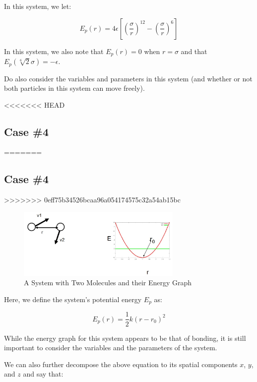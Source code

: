 \documentclass[
  letterpaper,
  DIV=11,
  numbers=noendperiod]{scrreprt}
\begin{document}
In this system, we let:

\begin{equation}
  E_p(r) = 4\epsilon\left[\left(\frac{\sigma}{r}\right)^{12} - \left(\frac{\sigma}{r}\right)^6\right]
\end{equation}

In this system, we also note that \(E_p(r) = 0\) when \(r = \sigma\) and
that \(\displaystyle E_p(\sqrt[6]{2}\sigma) = -\epsilon\).

Do also consider the variables and parameters in this system (and
whether or not both particles in this system can move freely).

<<<<<<< HEAD
\hypertarget{case-4-1}{%
\subsection{Case \#4}\label{case-4-1}}
=======
\hypertarget{case-4}{%
\subsection{Case \#4}\label{case-4}}
>>>>>>> 0eff75b34526bcaa96a054174575c32a54ab15bc

\begin{figure}

{\centering \includegraphics[width=3.13in,height=\textheight]{./images/wk1/sys4.jpg}

}

\caption{A System with Two Molecules and their Energy Graph}

\end{figure}

Here, we define the system's potential energy \(E_p\) as:

\begin{equation}
  E_p(r) = \frac{1}{2}k(r - r_0)^2
\end{equation}

While the energy graph for this system appears to be that of bonding, it
is still important to consider the variables and the parameters of the
system.

We can also further decompose the above equation to its spatial
components \(x\), \(y\), and \(z\) and say that:
\end{document}
